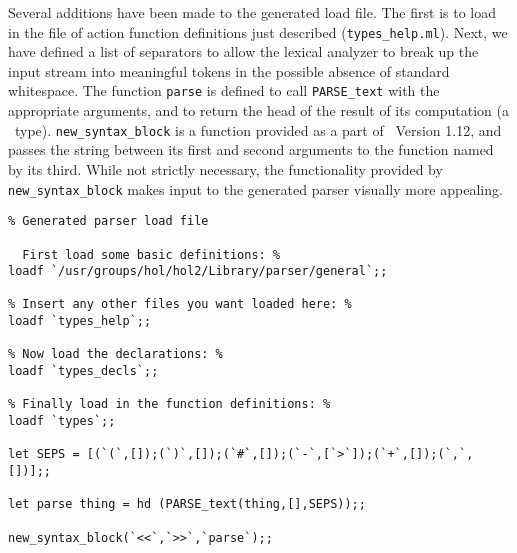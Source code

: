 Several additions have been made to the generated load file.  The first is to
load in the file of action function definitions just described 
(\verb"types_help.ml").  Next, we have defined a list of separators to allow
the lexical analyzer to break up the input stream into meaningful tokens in
the possible absence of standard whitespace.  The function 
\verb"parse" is
defined to call \verb"PARSE_text" 
with the 
appropriate arguments, and to
return the head of the result of its computation (a \HOL\ type).  
\verb"new_syntax_block" is a function provided as a part of \HOL\ Version 1.12,
and passes the string between its first and second arguments to the function
named by its third.  While not strictly necessary, the functionality provided
by \verb"new_syntax_block" makes input to the generated parser visually 
more appealing.
\begin{center}
\begin{boxed}
\begin{verbatim}
% Generated parser load file

  First load some basic definitions: %
loadf `/usr/groups/hol/hol2/Library/parser/general`;;

% Insert any other files you want loaded here: %
loadf `types_help`;;

% Now load the declarations: %
loadf `types_decls`;;

% Finally load in the function definitions: %
loadf `types`;;

let SEPS = [(`(`,[]);(`)`,[]);(`#`,[]);(`-`,[`>`]);(`+`,[]);(`,`,[])];;

let parse thing = hd (PARSE_text(thing,[],SEPS));;

new_syntax_block(`<<`,`>>`,`parse`);;
\end{verbatim}
\end{boxed}
\end{center}


